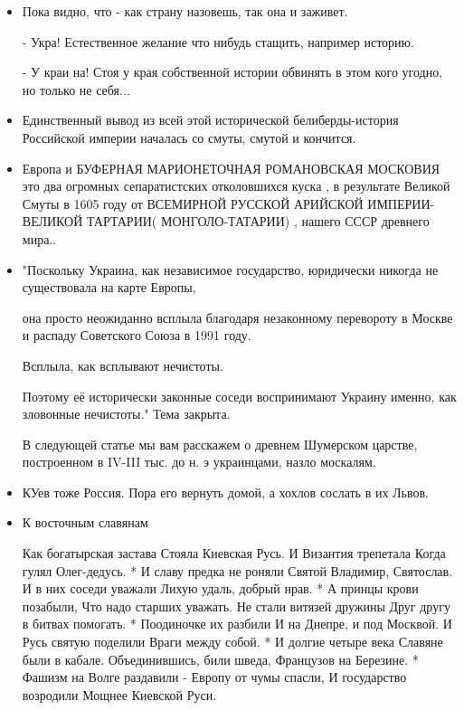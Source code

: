 \begin{itemize}
\item {}

Пока видно, что - как страну назовешь, так она и заживет.

- Укра! Естественное желание что нибудь стащить, например историю.

- У краи на! Стоя у края собственной истории обвинять в этом кого угодно, но
только не себя...

\item {}

Единственный вывод из всей этой исторической белиберды-история Российской империи началась со смуты, смутой и кончится.

\item {}

Европа и БУФЕРНАЯ МАРИОНЕТОЧНАЯ РОМАНОВСКАЯ МОСКОВИЯ это два огромных
сепаратистских отколовшихся куска , в результате Великой Смуты в 1605 году от
ВСЕМИРНОЙ РУССКОЙ АРИЙСКОЙ ИМПЕРИИ- ВЕЛИКОЙ ТАРТАРИИ( МОНГОЛО-ТАТАРИИ) , нашего
СССР древнего мира..

\item {}

"Поскольку Украина, как независимое государство, юридически никогда не
существовала на карте Европы,

она просто неожиданно всплыла благодаря незаконному перевороту в Москве и
распаду Советского Союза в 1991 году.

Всплыла, как всплывают нечистоты.

Поэтому её исторически законные соседи воспринимают Украину именно, как
зловонные нечистоты." Тема закрыта.

В следующей статье мы вам расскажем о древнем Шумерском царстве, построенном в
IV-III тыс. до н. э украинцами, назло москалям.

\item {}

КУев тоже Россия. Пора его вернуть домой, а хохлов сослать в их Львов.

\item {}


К восточным славянам

Как богатырская застава
Стояла Киевская Русь.
И Византия трепетала
Когда гулял Олег-дедусь.
*
И славу предка не роняли
Святой Владимир, Святослав.
И в них соседи уважали
Лихую удаль, добрый нрав.
*
А принцы крови позабыли,
Что надо старших уважать.
Не стали витязей дружины
Друг другу в битвах помогать.
*
Поодиночке их разбили
И на Днепре, и под Москвой.
И Русь святую поделили
Враги между собой.
*
И долгие четыре века
Славяне были в кабале.
Объединившись, били шведа,
Французов на Березине.
*
Фашизм на Волге раздавили -
Европу от чумы спасли,
И государство возродили
Мощнее Киевской Руси.


\end{itemize}

